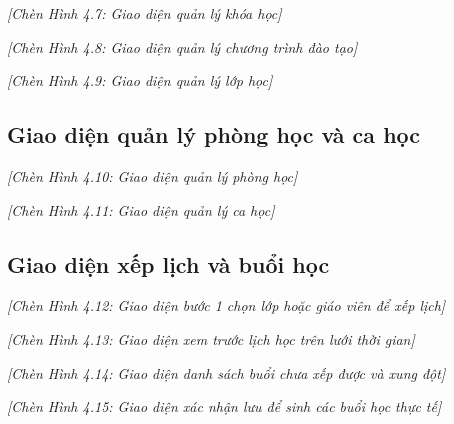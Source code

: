 \documentclass[../DoAn.tex]{subfiles}
\begin{document}
\textit{[Chèn Hình 4.7: Giao diện quản lý khóa học]}

\textit{[Chèn Hình 4.8: Giao diện quản lý chương trình đào tạo]}

\textit{[Chèn Hình 4.9: Giao diện quản lý lớp học]}

\subsection{Giao diện quản lý phòng học và ca học}

\textit{[Chèn Hình 4.10: Giao diện quản lý phòng học]}

\textit{[Chèn Hình 4.11: Giao diện quản lý ca học]}

\subsection{Giao diện xếp lịch và buổi học}

\textit{[Chèn Hình 4.12: Giao diện bước 1 chọn lớp hoặc giáo viên để xếp lịch]}

\textit{[Chèn Hình 4.13: Giao diện xem trước lịch học trên lưới thời gian]}

\textit{[Chèn Hình 4.14: Giao diện danh sách buổi chưa xếp được và xung đột]}

\textit{[Chèn Hình 4.15: Giao diện xác nhận lưu để sinh các buổi học thực tế]}
\end{document}
